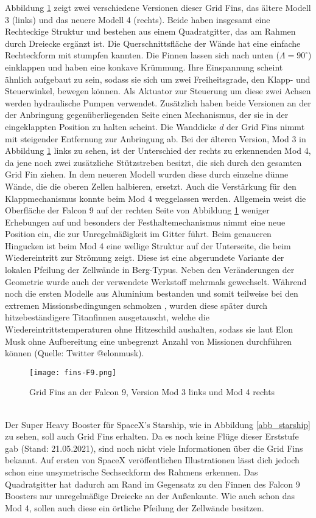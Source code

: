 Abbildung \ref{abb_finsF9} zeigt zwei verschiedene Versionen dieser Grid Fins, das ältere Modell 3 (links) und das neuere Modell 4 (rechts). Beide haben insgesamt eine Rechteckige Struktur und bestehen aus einem Quadratgitter, das am Rahmen durch Dreiecke ergänzt ist. Die Querschnittsfläche der Wände hat eine einfache Rechteckform mit stumpfen kannten. Die Finnen lassen sich nach unten ($\Lambda = 90^\circ$) einklappen und haben eine konkave Krümmung. Ihre Einspannung scheint ähnlich aufgebaut zu sein, sodass sie sich um zwei Freiheitsgrade, den Klapp- und Steuerwinkel, bewegen können. Als Aktuator zur Steuerung um diese zwei Achsen werden hydraulische Pumpen verwendet. Zusätzlich haben beide Versionen an der der Anbringung gegenüberliegenden Seite einen Mechanismus, der sie in der eingeklappten Position zu halten scheint. Die Wanddicke $d$ der Grid Fins nimmt mit steigender Entfernung zur Anbringung ab. Bei der älteren Version, Mod 3 in Abbildung \ref{abb_finsF9} links zu sehen, ist der Unterschied der rechts zu erkennenden Mod 4, da jene noch zwei zusätzliche Stützstreben besitzt, die sich durch den gesamten Grid Fin ziehen. In dem neueren Modell wurden diese durch einzelne dünne Wände, die die oberen Zellen halbieren, ersetzt. Auch die Verstärkung für den Klappmechanismus konnte beim Mod 4 weggelassen werden. Allgemein weist die Oberfläche der Falcon 9 auf der rechten Seite von Abbildung \ref{abb_finsF9} weniger Erhebungen auf und besonders der Festhaltemechanismus nimmt eine neue Position ein, die zur Unregelmäßigkeit im Gitter führt. Beim genaueren Hingucken ist beim Mod 4 eine wellige Struktur auf der Unterseite, die beim Wiedereintritt zur Strömung zeigt. Diese ist eine abgerundete Variante der lokalen Pfeilung der Zellwände in Berg-Typus. Neben den Veränderungen der Geometrie wurde auch der verwendete Werkstoff mehrmals gewechselt. Während noch die ersten Modelle aus Aluminium bestanden und somit teilweise bei den extremen Missionsbedingungen schmolzen \cite{titanium}, wurden diese später durch hitzebeständigere Titanfinnen ausgetauscht, welche die Wiedereintrittstemperaturen ohne Hitzeschild aushalten, sodass sie laut Elon Musk ohne Aufbereitung eine unbegrenzt Anzahl von Missionen durchführen können (Quelle: Twitter @elonmusk).
\begin{figure}[h]
	\centering
	\texttt{[image: fins-F9.png]}
	\begin{flushright}
	\end{flushright}
	\caption{Grid Fins an der Falcon 9, Version Mod 3 links und Mod 4 rechts}
	\label{abb_finsF9}
\end{figure}\\
Der Super Heavy Booster für SpaceX's Starship, wie in Abbildung \ref{abb_starship} zu sehen, soll auch Grid Fins erhalten. Da es noch keine Flüge dieser Erststufe gab (Stand: 21.05.2021), sind noch nicht viele Informationen über die Grid Fins bekannt. Auf ersten von SpaceX veröffentlichen Illustrationen lässt dich jedoch schon eine unsymetrische Sechseckform des Rahmens erkennen. Das Quadratgitter hat dadurch am Rand im Gegensatz zu den Finnen des Falcon 9 Boosters nur unregelmäßige Dreiecke an der Außenkante. Wie auch schon das Mod 4, sollen auch diese ein örtliche Pfeilung der Zellwände besitzen.


